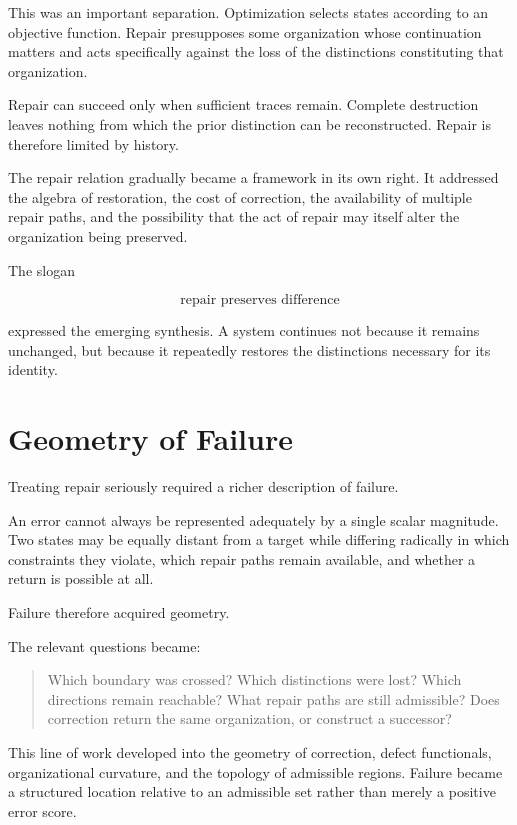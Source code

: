 \documentclass[11pt,oneside]{book}
\numberwithin{equation}{chapter}
\theoremstyle{definition}
\theoremstyle{plain}
\begin{document}
This was an important separation. Optimization selects states according to
an objective function. Repair presupposes some organization whose
continuation matters and acts specifically against the loss of the
distinctions constituting that organization.

Repair can succeed only when sufficient traces remain. Complete destruction
leaves nothing from which the prior distinction can be reconstructed. Repair
is therefore limited by history.

The repair relation gradually became a framework in its own right. It
addressed the algebra of restoration, the cost of correction, the
availability of multiple repair paths, and the possibility that the act of
repair may itself alter the organization being preserved.

The slogan

\[
\text{repair preserves difference}
\]

expressed the emerging synthesis. A system continues not because it remains
unchanged, but because it repeatedly restores the distinctions necessary
for its identity.

\section{Geometry of Failure}

Treating repair seriously required a richer description of failure.

An error cannot always be represented adequately by a single scalar
magnitude. Two states may be equally distant from a target while differing
radically in which constraints they violate, which repair paths remain
available, and whether a return is possible at all.

Failure therefore acquired geometry.

The relevant questions became:

\begin{quote}
Which boundary was crossed? Which distinctions were lost? Which directions
remain reachable? What repair paths are still admissible? Does correction
return the same organization, or construct a successor?
\end{quote}

This line of work developed into the geometry of correction, defect
functionals, organizational curvature, and the topology of admissible
regions. Failure became a structured location relative to an admissible set
rather than merely a positive error score.
\end{document}
